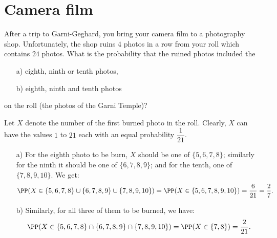 \section{Camera film}
\begin{problem} %
After a trip to Garni-Geghard, you bring your camera film to a photography shop. Unfortunately, the shop ruins $4$ photos in a row from your roll which contains $24$ photos. What is the probability that the ruined photos included the
\begin{enumerate}
    \item[a) ] eighth, ninth or tenth photos,
    \item[b) ] eighth, ninth and tenth photos
\end{enumerate}
on the roll (the photos of the Garni Temple)?
\end{problem}
\bigskip
\begin{solution} %
Let $X$ denote the number of the first burned photo in the roll. Clearly, $X$ can have the values $1$ to $21$ each with an equal probability $\dfrac{1}{21}$.
\begin{enumerate}
    \item[a) ] For the eighth photo to be burn, $X$ should be one of $\{5, 6, 7, 8\}$; similarly for the ninth it should be one of $\{6, 7, 8, 9\}$; and for the tenth, one of $\{7, 8, 9, 10\}$. We get:
    \[
        \PP(X\in \{5, 6, 7, 8\} \cup \{6,7,8,9\}\cup\{7,8, 9, 10\}) = \PP(X\in \{5, 6, 7, 8, 9, 10\}) = \dfrac{6}{21} = \dfrac{2}{7}.
    \]
    
    \item[b) ] Similarly, for all three of them to be burned, we have:
    \[
        \PP(X\in \{5, 6, 7, 8\} \cap \{6,7,8,9\}\cap\{7,8, 9, 10\}) = \PP(X\in \{7, 8\}) = \dfrac{2}{21}.
    \]
\end{enumerate}

\end{solution}


